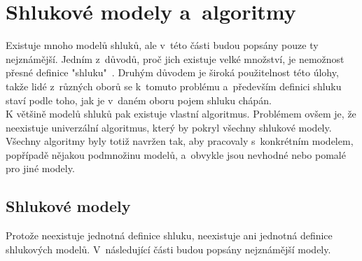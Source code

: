 
\section{Shlukové modely a~algoritmy} \label{sec:clustermodels}
Existuje mnoho modelů shluků, ale v~této části budou popsány pouze ty nejznámější. Jedním z~důvodů, proč jich existuje velké množství, je nemožnost přesné definice "shluku"~\cite{EstivillCastro02}. Druhým důvodem je široká použitelnost této úlohy, takže lidé z~různých oborů se k~tomuto problému a~především definici shluku staví podle toho, jak je v~daném oboru pojem shluku chápán.\\

K většině modelů shluků pak existuje vlastní algoritmus. Problémem ovšem je, že neexistuje univerzální algoritmus, který by pokryl všechny shlukové modely. Všechny algoritmy byly totiž navržen tak, aby pracovaly s~konkrétním modelem, popřípadě nějakou podmnožinu modelů, a~obvykle jsou nevhodné nebo pomalé pro jiné modely.

\subsection{Shlukové modely}
Protože neexistuje jednotná definice shluku, neexistuje ani jednotná definice shlu\-ko\-vý\-ch modelů. V~následující části budou popsány nejznámější modely.

